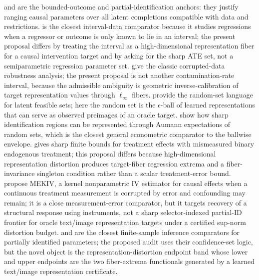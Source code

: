 \documentclass[11pt]{article}
\theoremstyle{definition}
\theoremstyle{plain}
\theoremstyle{remark}
\begin{document}
\citet{Manski1990} and \citet{Manski2003} are the bounded-outcome and partial-identification anchors: they justify ranging causal parameters over all latent completions compatible with data and restrictions.  \citet{ManskiTamer2002} is the closest interval-data comparator because it studies regressions when a regressor or outcome is only known to lie in an interval; the present proposal differs by treating the interval as a high-dimensional representation fiber for a causal intervention target and by asking for the sharp ATE set, not a semiparametric regression parameter set.  \citet{HorowitzManski1995} give the classic corrupted-data robustness analysis; the present proposal is not another contamination-rate interval, because the admissible ambiguity is geometric inverse-calibration of target representation values through \(\ell_\infty\) fibers.  \citet{BeresteanuMolchanovMolinari2012} provide the random-set language for latent feasible sets; here the random set is the \(\epsilon\)-ball of learned representations that can serve as observed preimages of an oracle target.  \citet{BeresteanuMolchanovMolinari2011} show how sharp identification regions can be represented through Aumann expectations of random sets, which is the closest general econometric comparator to the ballwise envelope.  \citet{Ura2018} gives sharp finite bounds for treatment effects with mismeasured binary endogenous treatment; this proposal differs because high-dimensional representation distortion produces target-fiber regression extrema and a fiber-invariance singleton condition rather than a scalar treatment-error bound.  \citet{ZhuGultchinGrettonKusnerSilva2022} propose MEKIV, a kernel nonparametric IV estimator for causal effects when a continuous treatment measurement is corrupted by error and confounding may remain; it is a close measurement-error comparator, but it targets recovery of a structural response using instruments, not a sharp selector-indexed partial-ID frontier for oracle text/image representation targets under a certified sup-norm distortion budget.
\citet{ImbensManski2004} and \citet{Stoye2009} are the closest finite-sample inference comparators for partially identified parameters; the proposed audit uses their confidence-set logic, but the novel object is the representation-distortion endpoint band whose lower and upper endpoints are the two fiber-extrema functionals generated by a learned text/image representation certificate.
\end{document}
